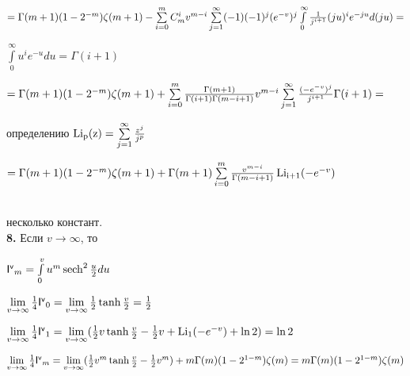 \documentclass[a4paper,12pt]{article}
\begin{document}
\begin{center}
    $= \Gamma(m + 1)(1 - 2^{- m})\zeta(m + 1) - \sum\limits_{i = 0}^m C_m^i v^{m - i} \sum\limits_{j = 1}^{\infty} (-1) (-1)^{j} (e^{-v})^j\int\limits_0^{\infty}{1\over{j^{i + 1}}} (j u)^{i} e^{-j u}d (j u) = $
\end{center}

 $\int\limits_0^{\infty} u^{i} e^{-u}d u = \Gamma(i + 1)$

\begin{center}
    $= \Gamma(m + 1)(1 - 2^{- m})\zeta(m + 1) + \sum\limits_{i = 0}^m {\Gamma(m + 1)\over{\Gamma(i + 1) \Gamma(m - i + 1)}} v^{m - i} \sum\limits_{j = 1}^{\infty} {(-e^{-v})^j\over{j^{i + 1}}} \Gamma(i + 1) = $
\end{center}

 определению $\operatorname{Li_p(z)} = \sum\limits_{j = 1}^{\infty} {z^{j}\over{j^p}}$

\begin{center}
    $= \Gamma(m + 1)(1 - 2^{- m})\zeta(m + 1) + \Gamma(m + 1)\sum\limits_{i = 0}^m {v^{m - i}\over{\Gamma(m - i + 1)}} \operatorname{Li_{i + 1}}(-e^{-v})$
\end{center}\\

 несколько констант.\\

\noindent\textbf{8.} Если $v \longrightarrow \infty$, то

\begin{center}
    $\mathsf{I^{v}}_m = \int\limits_0^{v} u^m \operatorname{sech}^2{u\over{2}} d u$
\end{center}

\begin{center}
    $\lim\limits_{v \rightarrow \infty} {1\over{4}}\mathsf{I^{v}}_0 = \lim\limits_{v \rightarrow \infty} {1\over{2}} \operatorname{tanh}{v\over{2}} = {1\over{2}}$
\end{center}

\begin{center}
    $\lim\limits_{v \rightarrow \infty} {1\over{4}} \mathsf{I^{v}}_1 = \lim\limits_{v \rightarrow \infty} ({1\over{2}} v\operatorname{tanh}{v\over{2}} - {1\over{2}}v + \operatorname{Li_1}(-e^{-v}) + \ln{2}) = \ln{2}$
\end{center}

\begin{center}
    $\lim\limits_{v \rightarrow \infty} {1\over{4}} \mathsf{I^{v}}_m = \lim\limits_{v \rightarrow \infty} ({1\over{2}} v^m \operatorname{tanh}{v\over{2}} - {1\over{2}}v^m) + m \Gamma(m)(1 - 2^{1 - m})\zeta(m) = m \Gamma(m)(1 - 2^{1 - m})\zeta(m)$
\end{center}
\end{document}

